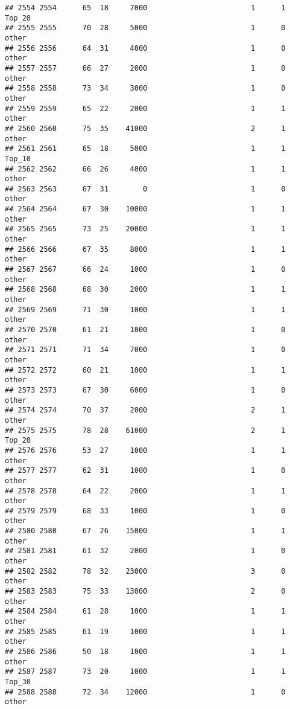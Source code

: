 \documentclass[
]{article}
\begin{document}
\begin{verbatim}
## 2554 2554      65  18     7000                        1      1   Top_20
## 2555 2555      70  28     5000                        1      0    other
## 2556 2556      64  31     4000                        1      0    other
## 2557 2557      66  27     2000                        1      0    other
## 2558 2558      73  34     3000                        1      0    other
## 2559 2559      65  22     2000                        1      1    other
## 2560 2560      75  35    41000                        2      1    other
## 2561 2561      65  18     5000                        1      1   Top_10
## 2562 2562      66  26     4000                        1      1    other
## 2563 2563      67  31        0                        1      0    other
## 2564 2564      67  30    10000                        1      1    other
## 2565 2565      73  25    20000                        1      1    other
## 2566 2566      67  35     8000                        1      1    other
## 2567 2567      66  24     1000                        1      0    other
## 2568 2568      68  30     2000                        1      1    other
## 2569 2569      71  30     1000                        1      1    other
## 2570 2570      61  21     1000                        1      0    other
## 2571 2571      71  34     7000                        1      0    other
## 2572 2572      60  21     1000                        1      1    other
## 2573 2573      67  30     6000                        1      0    other
## 2574 2574      70  37     2000                        2      1    other
## 2575 2575      78  28    61000                        2      1   Top_20
## 2576 2576      53  27     1000                        1      1    other
## 2577 2577      62  31     1000                        1      0    other
## 2578 2578      64  22     2000                        1      1    other
## 2579 2579      68  33     1000                        1      0    other
## 2580 2580      67  26    15000                        1      1    other
## 2581 2581      61  32     2000                        1      0    other
## 2582 2582      78  32    23000                        3      0    other
## 2583 2583      75  33    13000                        2      0    other
## 2584 2584      61  28     1000                        1      1    other
## 2585 2585      61  19     1000                        1      1    other
## 2586 2586      50  18     1000                        1      1    other
## 2587 2587      73  20     1000                        1      1   Top_30
## 2588 2588      72  34    12000                        1      0    other

\end{verbatim}
\end{document}

